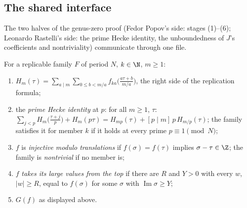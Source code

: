 \subsection{The shared interface}

The two halves of the genus-zero proof (Fedor Popov's side: stages (1)--(6); Leonardo Rastelli's side: the prime Hecke
identity, the unboundedness of $J$'s coefficients and nontriviality) communicate through one file.

\begin{definition}\label{ch19:def:interface}
For a replicable family $F$ of period $N$, $k\in\N$, $m\ge1$:
\begin{enumerate}[label=(\alph*)]
\item $H_m(\tau)=\sum_{a\mid m}\sum_{0\le b<m/a}f_{ka}\bigl(\frac{a\tau+b}{m/a}\bigr)$, the right side of the replication formula;
\item the \emph{prime Hecke identity} at $p$: for all $m\ge1$, $\tau$:
  $\sum_{j<p}H_m\bigl(\frac{\tau+j}p\bigr)+H_m(p\tau)=H_{mp}(\tau)+[p\mid m]\,p\,H_{m/p}(\tau)$; the family satisfies it for member $k$
  if it holds at every prime $p\equiv1\pmod N$;
\item $f$ is \emph{injective modulo translations} if $f(\sigma)=f(\tau)$ implies $\sigma-\tau\in\Z$; the family is
  \emph{nontrivial} if no member is;
\item $f$ \emph{takes its large values from the top} if there are $R$ and $Y>0$ with every $w$, $|w|\ge R$, equal to $f(\sigma)$ for
  some $\sigma$ with $\operatorname{Im}\sigma\ge Y$;
\item $G(f)$ as displayed above.
\end{enumerate}
\end{definition}
